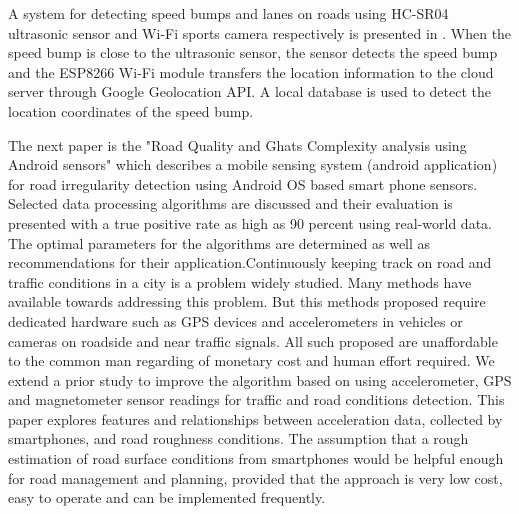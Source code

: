 \noindent
A system for detecting speed bumps and lanes on roads using HC-SR04 ultrasonic sensor and Wi-Fi sports camera respectively is presented in \cite{R18}. When the speed bump is close to the ultrasonic sensor, the sensor detects the speed bump and the ESP8266 Wi-Fi module transfers the location information to the cloud server through Google Geolocation API. A local database is used to detect the location coordinates of the speed bump.

\noindent
The next paper is the "Road Quality and Ghats
Complexity analysis using Android sensors"\cite{R5} which describes a mobile sensing system (android application) for road irregularity detection using Android OS based smart phone sensors. Selected data processing algorithms are discussed and their evaluation is presented with a true positive rate as high as 90 percent using real-world data. The optimal parameters for the algorithms are determined as well as recommendations for their application.Continuously keeping track on road and traffic conditions in a city is a problem widely studied. Many methods have available towards addressing this problem. But this methods proposed require dedicated hardware such as GPS devices and accelerometers in vehicles or cameras on roadside and near traffic signals. All such proposed are unaffordable to the common man regarding of monetary cost and human effort required. We extend a prior study to improve the algorithm based on using accelerometer, GPS and magnetometer sensor readings for traffic and road conditions detection. This paper explores features and relationships between acceleration data, collected by smartphones, and road roughness conditions. The assumption that a rough estimation of road surface conditions from smartphones would be helpful enough for road management and planning, provided that the approach is very low cost, easy to operate and can be implemented frequently.
